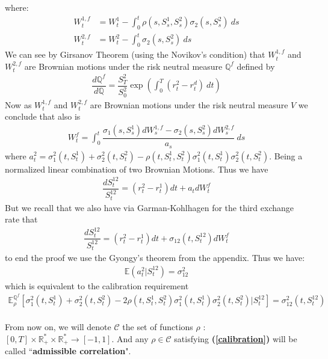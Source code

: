 \documentclass[a4paper, 12pt]{article}
\numberwithin{equation}{subsection}
\begin{document}
where:
\begin{align}
W_t^{1,f} &= W_t^{1} - \int_0^t \rho(s, S_s^{1}, S_s^{2}) \sigma_2(s, S_s^{2}) \: ds \\
W_t^{2,f} &= W_t^{2} - \int_0^t \sigma_2(s, S_s^{2}) \: ds
\end{align}
We can see by Girsanov Theorem (using the Novikov's condition) that $W_t^{1,f}$ and $W_t^{2,f}$ are Brownian motions under the risk neutral measure $\mathbb{Q}^{f}$ defined by 
\begin{align}
\dfrac{d\mathbb{Q}^{f}}{d\mathbb{Q}} = \dfrac{S_T^{2}}{S_0^{2}} \exp \left( \int_0^{T} (r_t^{2} - r_t^{d}) \: dt \right)
\end{align}
Now as $W_t^{1,f}$ and $W_t^{2,f}$ are Brownian motions under the risk neutral measure $V$ we conclude that also is 
\begin{align}
W_t^{f} = \int_0^{t} \dfrac{\sigma_1(s,S_s^1)dW_s^{1,f} - \sigma_2(s, S_s^{2})dW_s^{2,f}}{a_s} \:ds
\end{align}
where $a_t^2 = \sigma_1^2(t, S_t^1) + \sigma_2^2(t, S_t^2) - \rho(t, S_t^1, S_t^2)\sigma_1^2(t, S_t^1)\sigma_2^2(t, S_t^2)$. Being a normalized linear combination of two Brownian Motions. Thus we have 
\begin{align}
\dfrac{dS^{12}_{t}}{S^{12}_{t}} = (r_t^{2} - r_t^{1}) dt + a_t dW_t^f
\end{align}
But we recall that we also have via Garman-Kohlhagen for the third exchange rate that
\begin{align}
\dfrac{dS^{12}_{t}}{S^{12}_{t}} = (r_t^{2} - r_t^{1}) dt + \sigma_{12}(t, S_t^{12}) dW_t^f
\end{align}
to end the proof we use the Gyongy's theorem from the appendix. Thus we have:
\begin{align}
\mathbb{E}(a_t^2 | S_t^{12}) = \sigma_{12}^2
\end{align}
which is equivalent to the calibration requirement
\begin{align}
\mathbb{E}^{\mathbb{Q}^f}_{\rho} \left[ \sigma_1^2(t, S_t^1) + \sigma_2^2(t, S_t^2) - 2\rho(t, S_t^1, S_t^2)\sigma_1^2(t, S_t^1)\sigma_2^2(t, S_t^2)|S_t^{12} \right] = \sigma_{12}^2(t, S_t^{12}) \label{calibration}
\end{align}
\\

From now on, we will denote $\mathcal{C}$ the set of functions $\rho$ : $[0,T] \times \mathbb{R}_+^* \times \mathbb{R}_+^* \to [-1,1]$. And any $\rho \in \mathcal{C}$ satisfying \textbf{(\ref{calibration})} will be called ``\textbf{admissible correlation}".
\\
\end{document}
